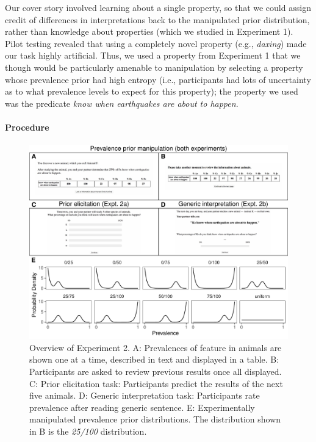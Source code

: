\documentclass[floatsintext,doc]{apa6}
\let\oldparagraph\paragraph
\renewcommand{\paragraph}[1]{\oldparagraph{#1}\mbox{}}
\newcommand{\mht}[1]{{\textcolor{Blue}{[mht: #1]}}}
\begin{document}
Our cover story involved learning about a single property, so that we could assign credit of differences in interpretations back to the manipulated prior distribution, rather than knowledge about properties (which we studied in Experiment 1). 
Pilot testing revealed that using a completely novel property (e.g., \emph{daxing}) made our task highly artificial. 
Thus, we used a property from Experiment 1 that we though would be particularly amenable to manipulation by selecting a property whose prevalence prior had high entropy (i.e., participants had lots of uncertainty as to what prevalence levels to expect for this property); the property we used was the predicate \emph{know when earthquakes are about to happen}.

\hypertarget{procedure}{%
\paragraph{Procedure}\label{procedure}}
%
\begin{figure}
\centering
\includegraphics{figs/expt2-overview.pdf}
\caption{\label{fig:priorManipulationExpt}Overview of Experiment 2. A: Prevalences of feature in animals are shown one at a time, described in text and displayed in a table. B: Participants are asked to review previous results once all displayed. C: Prior elicitation task: Participants predict the results of the next five animals. D: Generic interpretation task: Participants rate prevalence after reading generic sentence. E: Experimentally manipulated prevalence prior distributions. The distribution shown in B is the \emph{25/100} distribution.}
\end{figure}
\end{document}
